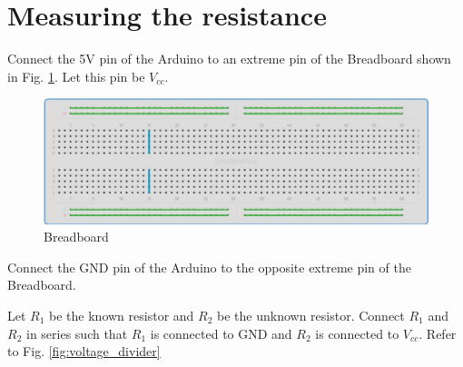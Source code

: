 \documentclass[journal,12pt,twocolumn]{IEEEtran}
\begin{document}




\section{Measuring the resistance}
\begin{problem}
Connect the 5V pin of the Arduino to an extreme pin of the Breadboard shown in Fig. \ref{fig:breadboard}.  Let this pin be $V_{cc}$.
\end{problem}
%
%
\begin{figure}
\centering
\includegraphics[width=\columnwidth]{./figs/breadboard.eps}
\caption{Breadboard}
\label{fig:breadboard}
\end{figure}
%
\begin{problem}
Connect the GND pin of the Arduino to the opposite extreme pin of the Breadboard.
\end{problem}
%
%
\begin{problem}
Let $R_1$ be the known resistor and $R_2$ be the unknown resistor.  Connect $R_1$ and $R_2$ in series such that $R_1$ is connected
to GND and $R_2$ is connected to $V_{cc}$. Refer to Fig. \ref{fig:voltage_divider}
\end{problem}
%
%
\end{document}
